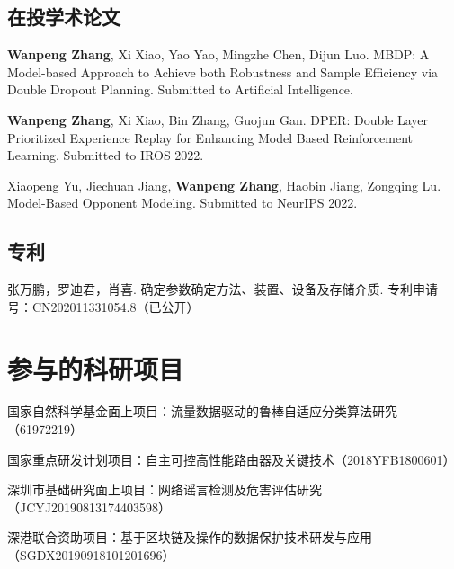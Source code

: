 \begin{resume}
  \subsection*{在投学术论文}
  \begin{achievements}
    \item \textbf{Wanpeng Zhang}, Xi Xiao, Yao Yao, Mingzhe Chen, Dijun Luo. MBDP: A Model-based Approach to Achieve both Robustness and Sample Efficiency via Double Dropout Planning. Submitted to Artificial Intelligence.
    \item \textbf{Wanpeng Zhang}, Xi Xiao, Bin Zhang, Guojun Gan. DPER: Double Layer Prioritized Experience Replay for Enhancing Model Based Reinforcement Learning. Submitted to IROS 2022.
    \item Xiaopeng Yu, Jiechuan Jiang, \textbf{Wanpeng Zhang}, Haobin Jiang, Zongqing Lu. Model-Based Opponent Modeling. Submitted to NeurIPS 2022.
  \end{achievements}


  \subsection*{专利}

  \begin{achievements}
    \item 张万鹏，罗迪君，肖喜. 确定参数确定方法、装置、设备及存储介质. 专利申请号：CN202011331054.8（已公开）
  \end{achievements}
  
    \section*{参与的科研项目}
    \begin{enumerate}[{[}1{]\;\;\;}]
        \item 国家自然科学基金面上项目：流量数据驱动的鲁棒自适应分类算法研究（61972219）
        \item 国家重点研发计划项目：自主可控高性能路由器及关键技术（2018YFB1800601）
        \item 深圳市基础研究面上项目：网络谣言检测及危害评估研究（JCYJ20190813174403598）
        \item 深港联合资助项目：基于区块链及操作的数据保护技术研发与应用（SGDX20190918101201696）
    \end{enumerate}

\end{resume}
